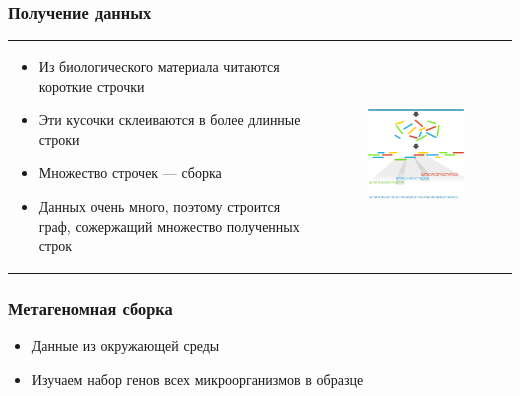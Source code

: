 \documentclass{beamer}
\begin{document}
    \begin{frame}
        \frametitle{Получение данных}
        \begin{tabular}{p{5cm} p{7cm}}
            \begin{itemize}
                \item Из биологического материала читаются короткие строчки
                \item Эти кусочки склеиваются в более длинные строки
                \item Множество строчек --- сборка
                \item Данных очень много, поэтому строится граф, сожержащий множество полученных строк
            \end{itemize}
            &
            \begin{figure}[b]
                \centering
                \includegraphics[width=6.5cm]{pictures/readsAssembly.png}  
            \end{figure}
        \end{tabular}
    \end{frame}
    
    \begin{frame}
        \frametitle{Метагеномная сборка}
        \begin{itemize}
            \item Данные из окружающей среды
            \item Изучаем набор генов всех микроорганизмов в образце
        \end{itemize}
    \end{frame}
    
\end{document}
